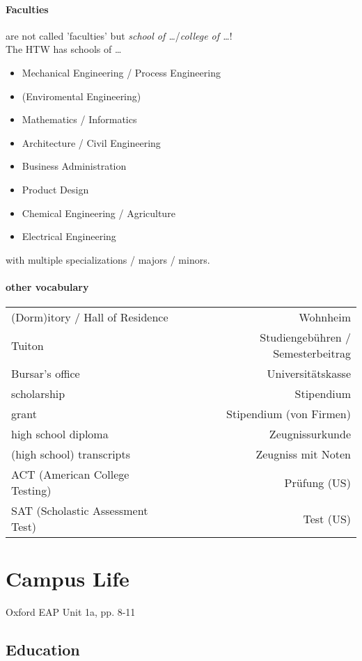 \paragraph{Faculties} are not called 'faculties' but \emph{school of …}/\emph{college of …}!\\
The HTW has schools of …
\begin{itemize}
\item Mechanical Engineering / Process Engineering
\item (Enviromental Engineering)
\item Mathematics / Informatics
\item Architecture / Civil Engineering
\item Business Administration
\item Product Design
\item Chemical Engineering / Agriculture
\item Electrical Engineering
\end{itemize}
with multiple specializations / majors / minors.

\paragraph{other vocabulary} \parskp
\begin{tabular}{l	r}
(Dorm)itory / Hall of Residence & Wohnheim\\
Tuiton & Studiengebühren / Semesterbeitrag\\
Bursar's office & Universitätskasse\\
scholarship & Stipendium\\
grant & Stipendium (von Firmen)\\
high school diploma & Zeugnissurkunde \\
(high school) transcripts & Zeugniss mit Noten\\
ACT (American College Testing) & Prüfung (US)\\
SAT (Scholastic Assessment Test) & Test (US)
\end{tabular}
\section{Campus Life}
Oxford EAP Unit 1a, pp. 8-11
\subsection{Education}

